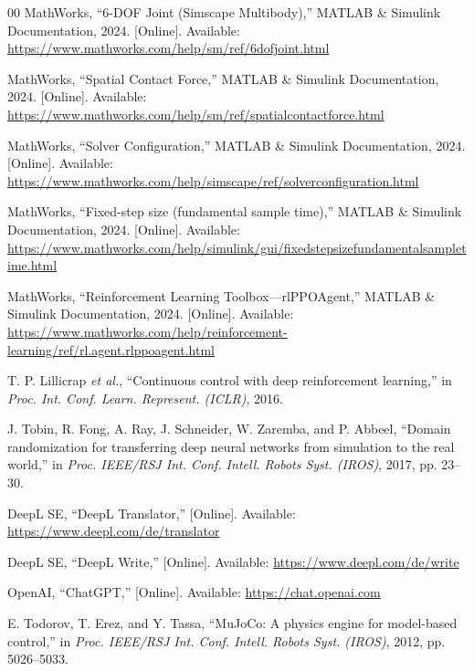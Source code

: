 \documentclass{ieeeaccess}
\begin{document}
\begin{thebibliography}{00}
MathWorks, ``6-DOF Joint (Simscape Multibody),'' MATLAB \& Simulink Documentation, 2024. [Online]. Available: \url{https://www.mathworks.com/help/sm/ref/6dofjoint.html}



MathWorks, ``Spatial Contact Force,'' MATLAB \& Simulink Documentation, 2024. [Online]. Available: \url{https://www.mathworks.com/help/sm/ref/spatialcontactforce.html}



MathWorks, ``Solver Configuration,'' MATLAB \& Simulink Documentation, 2024. [Online]. Available: \url{https://www.mathworks.com/help/simscape/ref/solverconfiguration.html}



MathWorks, ``Fixed-step size (fundamental sample time),'' MATLAB \& Simulink Documentation, 2024. [Online]. Available: \url{https://www.mathworks.com/help/simulink/gui/fixedstepsizefundamentalsampletime.html}



MathWorks, ``Reinforcement Learning Toolbox---rlPPOAgent,'' MATLAB \& Simulink Documentation, 2024. [Online]. Available: \url{https://www.mathworks.com/help/reinforcement-learning/ref/rl.agent.rlppoagent.html}



T. P. Lillicrap \emph{et al.}, ``Continuous control with deep reinforcement learning,'' in \emph{Proc. Int. Conf. Learn. Represent. (ICLR)},
2016.



J. Tobin, R. Fong, A. Ray, J. Schneider, W. Zaremba, and P. Abbeel, ``Domain
randomization for transferring deep neural networks from simulation to the real world,'' in \emph{Proc. IEEE/RSJ Int. Conf. Intell. Robots Syst. (IROS)},
2017, pp. 23--30.


DeepL SE, ``DeepL Translator,'' [Online]. Available: \url{https://www.deepl.com/de/translator}

DeepL SE, ``DeepL Write,'' [Online]. Available: \url{https://www.deepl.com/de/write}


OpenAI, ``ChatGPT,'' [Online]. Available: \url{https://chat.openai.com}



E. Todorov, T. Erez, and Y. Tassa, ``MuJoCo: A physics engine for model-based control,''
in \emph{Proc. IEEE/RSJ Int. Conf. Intell. Robots Syst. (IROS)}, 2012, pp. 5026--5033.




\end{thebibliography}
\end{document}
